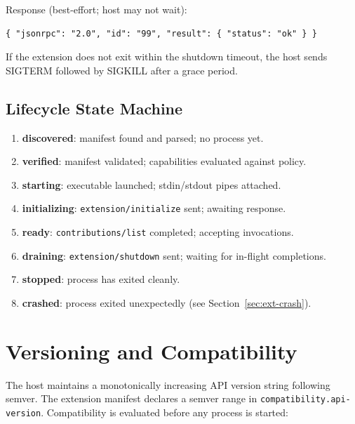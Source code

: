 Response (best-effort; host may not wait):

\begin{verbatim}
{ "jsonrpc": "2.0", "id": "99", "result": { "status": "ok" } }
\end{verbatim}

If the extension does not exit within the shutdown timeout, the host sends
SIGTERM followed by SIGKILL after a grace period.

\subsection{Lifecycle State Machine}

\begin{enumerate}
  \item \textbf{discovered}: manifest found and parsed; no process yet.
  \item \textbf{verified}: manifest validated; capabilities evaluated against
        policy.
  \item \textbf{starting}: executable launched; stdin/stdout pipes attached.
  \item \textbf{initializing}: \texttt{extension/initialize} sent; awaiting
        response.
  \item \textbf{ready}: \texttt{contributions/list} completed; accepting
        invocations.
  \item \textbf{draining}: \texttt{extension/shutdown} sent; waiting for
        in-flight completions.
  \item \textbf{stopped}: process has exited cleanly.
  \item \textbf{crashed}: process exited unexpectedly (see
        Section~\ref{sec:ext-crash}).
\end{enumerate}

\section{Versioning and Compatibility}
\label{sec:ext-versioning}

The host maintains a monotonically increasing API version string following
semver.  The extension manifest declares a semver range in
\texttt{compatibility.api-version}.  Compatibility is evaluated before any
process is started:

